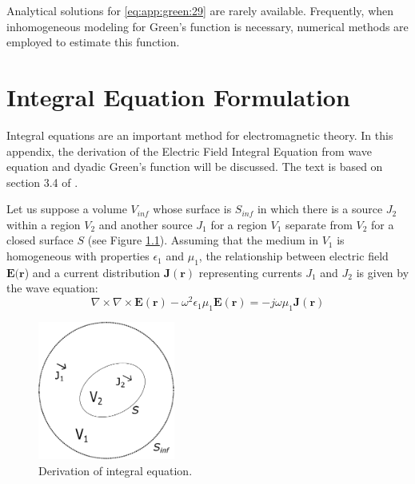    			Analytical solutions for \eqref{eq:app:green:29} are rarely available. Frequently, when inhomogeneous modeling for Green's function is necessary, numerical methods are employed to estimate this function.
   
    \chapter{Integral Equation Formulation}\label{app:integral}
    
   		Integral equations are an important method for electromagnetic theory. In this appendix, the derivation of the Electric Field Integral Equation from wave equation and dyadic Green's function will be discussed. The text is based on section 3.4 of \citep{chew2009}.

		Let us suppose a volume $V_ {inf}$ whose surface is $S_{inf}$ in which there is a source $J_2$ within a region $V_2$ and another source $J_1$ for a region $V_1$ separate from $V_2$ for a closed surface $S$ (see Figure \ref{fig:app:integral:integralequation}). Assuming that the medium in $V_1$ is homogeneous with properties $\epsilon_1$ and $\mu_1$, the relationship between electric field $\mathbf{E}(\mathbf{r}$) and a current distribution $\mathbf{J}(\mathbf{r}) $ representing currents $J_1$ and $J_2$ is given by the wave equation:
    	\begin{equation}
    		\nabla\times\nabla\times\mathbf{E}(\mathbf{r}) - \omega^2\epsilon_1\mu_1\mathbf{E}(\mathbf{r}) = -j\omega\mu_1\mathbf{J}(\mathbf{r}) \label{eq:app:integral:1}
   	 	\end{equation}
   	 	\begin{figure}[!htb]
			\centering
			\includegraphics[width=0.4\textwidth]{./figuras/integralequation}
			\caption{Derivation of integral equation.}
			\label{fig:app:integral:integralequation}
		\end{figure}

